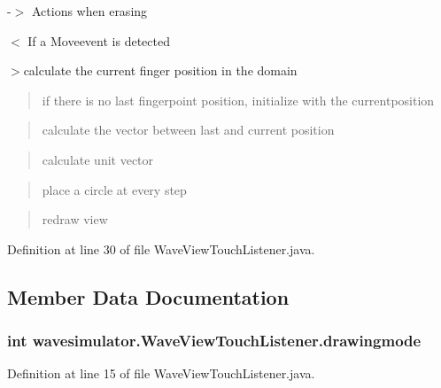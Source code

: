 -\/$>$ Actions when erasing

$<$ If a Moveevent is detected

$>$calculate the current finger position in the domain

\begin{quote}
if there is no last fingerpoint position, initialize with the currentposition \end{quote}


\begin{quote}
calculate the vector between last and current position \end{quote}


\begin{quote}
calculate unit vector \end{quote}


\begin{quote}
place a circle at every step \end{quote}


\begin{quote}
redraw view \end{quote}


Definition at line 30 of file Wave\+View\+Touch\+Listener.\+java.



\subsection{Member Data Documentation}
\subsubsection[{\texorpdfstring{drawingmode}{drawingmode}}]{\setlength{\rightskip}{0pt plus 5cm}int wavesimulator.\+Wave\+View\+Touch\+Listener.\+drawingmode}\hypertarget{classwavesimulator_1_1WaveViewTouchListener_a7ca3435bb1c387559ca1251e82fdf8a3}{}\label{classwavesimulator_1_1WaveViewTouchListener_a7ca3435bb1c387559ca1251e82fdf8a3}


Definition at line 15 of file Wave\+View\+Touch\+Listener.\+java.

